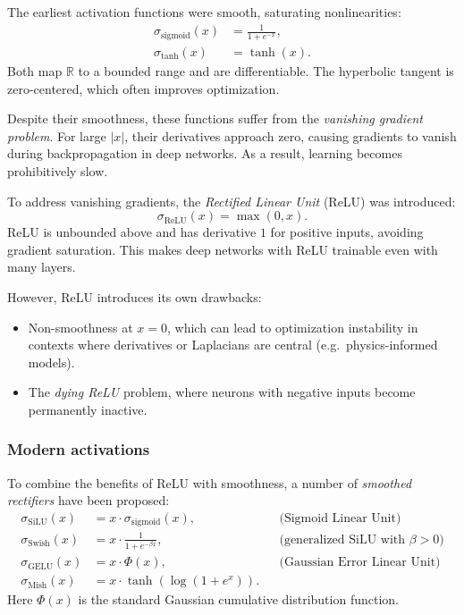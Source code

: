The earliest activation functions were smooth, saturating nonlinearities:
\begin{align}
  \sigma_{\text{sigmoid}}(x) &= \frac{1}{1+e^{-x}}, \\
  \sigma_{\tanh}(x) &= \tanh(x).
\end{align}
Both map $\mathbb{R}$ to a bounded range and are differentiable. 
The hyperbolic tangent is zero-centered, which often improves optimization.  

Despite their smoothness, these functions suffer from the 
\emph{vanishing gradient problem}. For large $|x|$, their derivatives 
approach zero, causing gradients to vanish during backpropagation in deep 
networks. As a result, learning becomes prohibitively slow.  


To address vanishing gradients, the \emph{Rectified Linear Unit} (ReLU) 
was introduced:
\begin{equation}
  \sigma_{\text{ReLU}}(x) = \max(0,x).
\end{equation}
ReLU is unbounded above and has derivative $1$ for positive inputs, 
avoiding gradient saturation. This makes deep networks with ReLU 
trainable even with many layers.  

However, ReLU introduces its own drawbacks:
\begin{itemize}
  \item Non-smoothness at $x=0$, which can lead to optimization instability 
  in contexts where derivatives or Laplacians are central (e.g.\ physics-informed models).  
  \item The \emph{dying ReLU} problem, where neurons with negative inputs 
  become permanently inactive.  
\end{itemize}

\subsubsection{Modern activations}
To combine the benefits of ReLU with smoothness, a number of 
\emph{smoothed rectifiers} have been proposed:
\begin{align}
  \sigma_{\text{SiLU}}(x) &= x \cdot \sigma_{\text{sigmoid}}(x), 
  &&\text{(Sigmoid Linear Unit)} \\
  \sigma_{\text{Swish}}(x) &= x \cdot \frac{1}{1+e^{-\beta x}}, 
  &&\text{(generalized SiLU with $\beta>0$)} \\
  \sigma_{\text{GELU}}(x) &= x \cdot \Phi(x), 
  &&\text{(Gaussian Error Linear Unit)} \\
  \sigma_{\text{Mish}}(x) &= x \cdot \tanh(\log(1+e^x)).
\end{align}
Here $\Phi(x)$ is the standard Gaussian cumulative distribution function.  

